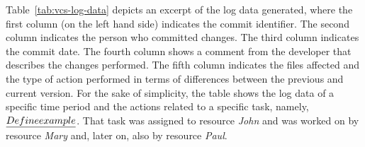 Table~\ref{tab:vcs-log-data} depicts an excerpt of the log data generated, where the first column (on the left hand side) indicates the commit identifier. The second column indicates the person who committed changes. The third column indicates the commit date. The fourth column shows a comment from the developer that describes the changes performed.
The fifth column indicates the files affected and the type of action performed in terms of differences between the previous and current version. 
For the sake of simplicity, the table shows the log data of a specific time period and the actions related to a specific task, namely, $\emph{Define example}$. That task was assigned to resource \emph{John} %
and was worked on by resource \emph{Mary} and, later on, also by resource \emph{Paul}.



